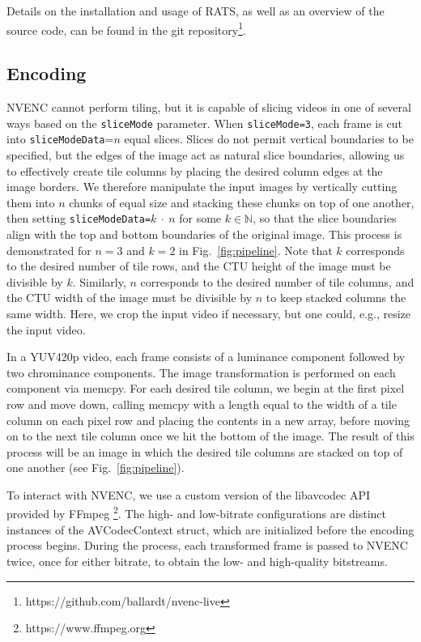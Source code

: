 Details on the installation and usage of RATS, as well as an overview of the source code, can be found in the git repository\footnote{https://github.com/ballardt/nvenc-live}.

\subsection{Encoding}

NVENC cannot perform tiling, but it is capable of slicing videos in one of several ways based on the \texttt{sliceMode} parameter. When \texttt{sliceMode=3}, each frame is cut into \texttt{sliceModeData}=$n$ equal slices. Slices do not permit vertical boundaries to be specified, but the edges of the image act as natural slice boundaries, allowing us to effectively create tile columns by placing the desired column edges at the image borders. We therefore manipulate the input images by vertically cutting them into $n$ chunks of equal size and stacking these chunks on top of one another, then setting \texttt{sliceModeData=}$k~\cdot~n$ for some $k \in \mathbb{N}$, so that the slice boundaries align with the top and bottom boundaries of the original image. This process is demonstrated for $n=3$ and $k=2$ in Fig.~\ref{fig:pipeline}. Note that $k$ corresponds to the desired number of tile rows, and the CTU height of the image must be divisible by $k$. Similarly, $n$ corresponds to the desired number of tile columns, and the CTU width of the image must be divisible by $n$ to keep stacked columns the same width. Here, we crop the input video if necessary, but one could, e.g., resize the input video.

In a YUV420p video, each frame consists of a luminance component followed by two chrominance components. The image transformation is performed on each component via memcpy. For each desired tile column, we begin at the first pixel row and move down, calling memcpy with a length equal to the width of a tile column on each pixel row and placing the contents in a new array, before moving on to the next tile column once we hit the bottom of the image. The result of this process will be an image in which the desired tile columns are stacked on top of one another (see Fig.~\ref{fig:pipeline}).

To interact with NVENC, we use a custom version of the libavcodec API provided by FFmpeg \footnote{https://www.ffmpeg.org}. The high- and low-bitrate configurations are distinct instances of the AVCodecContext struct, which are initialized before the encoding process begins. During the process, each transformed frame is passed to NVENC twice, once for either bitrate, to obtain the low- and high-quality bitstreams.

